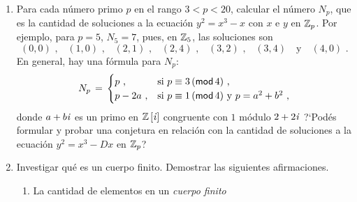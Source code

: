 \begin{enumerate}[label=P\arabic*]
		Si $p$ es un n\'umero primo, existen polinomios
		irreducibles de cualquier grado, en
		$\polinomios[x]{\Enterosmod[p]}$. Fijado un entero positivo
		$n$, definimos el siguiente polinomio:
		\begin{displaymath}
			P_n(x)\,=\,\prod_f\,f(x)
			\text{ ,}
		\end{displaymath}
		donde el producto se lleva a cabo sobre todos los
		polinomios \emph{m\'onicos} irreducibles de grado
		$n$ en $\polinomios[x]{\Enterosmod[p]}$. Hallar $P_1(x)$.
		Para un $n>0$ general, la siguiente identidad es v\'alida
		en $\polinomios[x]{\Enterosmod[p]}$:
		\begin{displaymath}
			\prod_{d\mid n,d>0}\,P_d(x)\,=\,
				x^{p^n}-x
			\text{ .}
		\end{displaymath}
	\item\label{item:cubica}
		Para cada n\'umero primo $p$ en el rango
		$3<p<20$, calcular el n\'umero $N_p$, que es la
		cantidad de soluciones a la ecuaci\'on
		\begin{math}
			y^2=x^3-x
		\end{math}
		con $x$ e $y$ en $\Enterosmod[p]$. Por ejemplo,
		para $p=5$, $N_5=7$, pues, en $\Enterosmod[5]$,
		las soluciones son
		\begin{displaymath}
			(0,0)\text{ ,}\quad
			(1,0)\text{ ,}\quad
			(2,1)\text{ ,}\quad
			(2,4)\text{ ,}\quad
			(3,2)\text{ ,}\quad
			(3,4)\quad\text{y}\quad
			(4,0)\text{ .}
		\end{displaymath}
		En general, hay una f\'ormula para $N_p$:
		\begin{displaymath}
			N_p\,=\,
				\begin{cases}
					p \text{ ,} &
					\text{si }p\equiv 3\tmodulo[4]
					\text{ ,} \\
					p-2a \text{ ,} &
					\text{si }p\equiv 1\tmodulo[4]
					\text{ y }
					p=a^2+b^2\text{ ,}
				\end{cases}
		\end{displaymath}
		donde $a+b\raizcuarta$ es un primo en
		$\polinomios[\raizcuarta] \Enteros$ congruente
		con $1$ m\'odulo $2+2\raizcuarta$
		?`Pod\'es formular y probar una conjetura en
		relaci\'on con la cantidad de soluciones a la
		ecuaci\'on $y^2=x^3-Dx$ en $\Enterosmod[p]$?
	\item\label{item:cuerpos}
		Investigar qu\'e es un cuerpo finito. Demostrar las
		siguientes afirmaciones.
		\begin{enumerate}[label=(\alph*)]
			\item
				La cantidad de elementos en un \emph{cuerpo finito}

\end{enumerate}
\end{enumerate}

